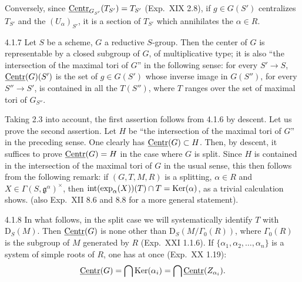 Conversely, since $\underline{\mathrm{Centr}}_{G_{S'}}(T_{S'})=T_{S'}$ (\cf Exp.~XIX 2.8), if $g\in G(S')$ centralizes $T_{S'}$ and the $(U_\alpha)_{S'}$, it is a section of $T_{S'}$ which annihilates the $\alpha\in R$.
\begin{corollary}{4.1.7}\label{XXII.4.1.7}
Let $S$ be a scheme, $G$ a reductive $S$-group. Then the center of $G$ is representable by a closed subgroup of $G$, of multiplicative type; it is also ``the intersection of the maximal tori of $G$'' in the following sense: for every $S'\to S$, $\underline{\mathrm{Centr}}(G)(S')$ is the set of $g\in G(S')$ whose inverse image in $G(S'')$, for every $S''\to S'$, is contained in all the $T(S'')$, where $T$ ranges over the set of maximal tori of $G_{S''}$.
\end{corollary}
Taking 2.3 into account, the first assertion follows from 4.1.6 by descent.{\renewcommand{\thefootnote}{(14)}} Let us prove the second assertion. Let $H$ be ``the intersection of the maximal tori of $G$'' in the preceding sense. One clearly has $\underline{\mathrm{Centr}}(G)\subset H$.{\renewcommand{\thefootnote}{(15)}} Then, by descent, it suffices to prove $\underline{\mathrm{Centr}}(G)=H$ in the case where $G$ is split. Since $H$ is contained in the intersection of the maximal tori of $G$ in the usual sense, this then follows from the following remark: if $(G,T,M,R)$ is a splitting, $\alpha\in R$ and $X\in\Gamma(S,\mathfrak g^\alpha)^\times$, then $\operatorname{int}(\exp_\alpha(X))(T)\cap T=\operatorname{Ker}(\alpha)$, as a trivial calculation shows. (\Cf also Exp.~XII 8.6 and 8.8 for a more general statement).
\begin{remark}{4.1.8}\label{XXII.4.1.8}
In what follows, in the split case we will systematically identify $T$ with $\mathrm D_S(M)$. Then $\underline{\mathrm{Centr}}(G)$ is none other than $\mathrm D_S(M/\Gamma_0(R))$, where $\Gamma_0(R)$ is the subgroup of $M$ generated by $R$ (\cf Exp.~XXI 1.1.6). If $\{\alpha_1,\alpha_2,\ldots,\alpha_n\}$ is a system of simple roots of $R$, one has at once (\cf Exp.~XX 1.19):
\[
\underline{\mathrm{Centr}}(G)=\bigcap\operatorname{Ker}(\alpha_i)=\bigcap\underline{\mathrm{Centr}}(Z_{\alpha_i}).
\]
\end{remark}
